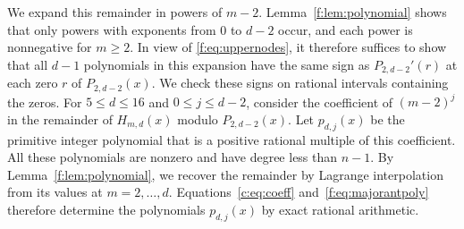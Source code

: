 \documentclass[11pt]{article}
\numberwithin{equation}{section}
\theoremstyle{remark}\newtheorem{remark}[theorem]{Remark}
\begin{document}
We expand this remainder in powers of $m-2$.
Lemma~\ref{f:lem:polynomial} shows that only powers with exponents from
$0$ to $d-2$ occur, and each power is nonnegative for $m\ge2$.
In view of \eqref{f:eq:uppernodes}, it therefore
suffices to show that all $d-1$ polynomials in this expansion have the same
sign as $P_{2,d-2}'(r)$ at each zero $r$ of $P_{2,d-2}(x)$.
We check these signs on rational intervals containing the zeros.
For $5\le d\le16$ and $0\le j\le d-2$, consider the coefficient of
$(m-2)^j$ in the remainder of $H_{m,d}(x)$ modulo $P_{2,d-2}(x)$. Let
$p_{d,j}(x)$ be the primitive integer polynomial that is a positive
rational multiple of this coefficient. All these polynomials are nonzero and
have degree less than $n-1$.
By Lemma~\ref{f:lem:polynomial}, we recover the remainder by Lagrange
interpolation from its values at $m=2,\ldots,d$.
Equations~\eqref{c:eq:coeff} and~\eqref{f:eq:majorantpoly} therefore
determine the polynomials $p_{d,j}(x)$ by exact rational arithmetic.
\end{document}
